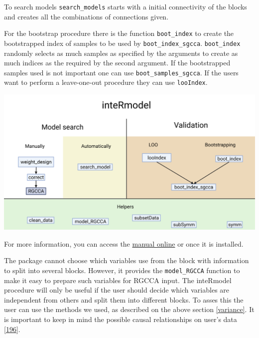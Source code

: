 \documentclass[
  12pt,
  a4paper,
  twoside,
  openright]{book}
\let\origfigure\figure
\let\endorigfigure\endfigure
\renewenvironment{figure}[1][2] {
    \expandafter\origfigure\expandafter[!htp]
} {
    \endorigfigure
}
\begin{document}
To search models \texttt{search\_models} starts with a initial connectivity of the blocks and creates all the combinations of connections given.

For the bootstrap procedure there is the function \texttt{boot\_index} to create the bootstrapped index of samples to be used by \texttt{boot\_index\_sgcca}.
\texttt{boot\_index} randomly selects as much samples as specified by the arguments to create as much indices as the required by the second argument.
If the bootstrapped samples used is not important one can use \texttt{boot\_samples\_sgcca}.
If the users want to perform a leave-one-out procedure they can use \texttt{looIndex}.

\begin{figure}
\includegraphics[width=1\linewidth]{images/inteRmodel-workflows} \caption[inteRmodel functions and workflow.]{`inteRmodel` functions and workflow. Functions provided by the inteRmodel package to search and validate models of relationships using RGCCA. Created with BioRender.com}\label{fig:intermodel-workflows}
\end{figure}

For more information, you can access the \href{https://llrs.github.io/inteRmodel/}{manual online} or once it is installed.

The package cannot choose which variables use from the block with information to split into several blocks.
However, it provides the \texttt{model\_RGCCA} function to make it easy to prepare such variables for RGCCA input.
The inteRmodel procedure will only be useful if the user should decide which variables are independent from others and split them into different blocks.
To asses this the user can use the methods we used, as described on the above section \ref{variance}.
It is important to keep in mind the possible causal relationships on user's data {[}\protect\hyperlink{ref-greenland2002}{196}{]}.
\end{document}
